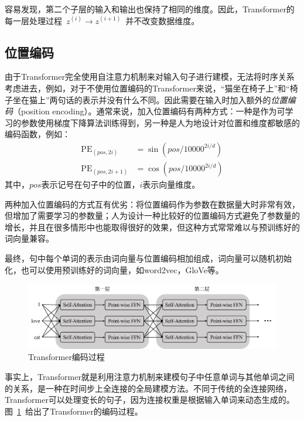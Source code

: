 容易发现，第二个子层的输入和输出也保持了相同的维度。因此，Transformer的每一层处理过程~$z^{(i)} \to z^{(i+1)}$~并不改变数据维度。
\subsection{位置编码}
由于Transformer完全使用自注意力机制来对输入句子进行建模，无法将时序关系考虑进去，例如，对于不使用位置编码的Transformer来说，“猫坐在椅子上”和“椅子坐在猫上”两句话的表示并没有什么不同。因此需要在输入时加入额外的\emph{位置编码}（position encoding）。通常来说，加入位置编码有两种方式：一种是作为可学习的参数使用梯度下降算法训练得到，另一种是人为地设计对位置和维度都敏感的编码函数，例如：
\begin{equation}
	\begin{aligned}
	\mathrm{PE}_{(pos, 2i)} &= \sin(pos/10000^{2i/d})\\
	\mathrm{PE}_{(pos, 2i+1)} &= \cos(pos/10000^{2i/d})
	\end{aligned}
\end{equation}
其中，$pos$表示记号在句子中的位置，$i$表示向量维度。

两种加入位置编码的方式互有优劣：将位置编码作为参数在数据量大时非常有效，但增加了需要学习的参数量；人为设计一种比较好的位置编码方式避免了参数量的增长，并且在很多情形中也能取得很好的效果，但这种方式常常难以与预训练好的词向量兼容。

最终，句中每个单词的表示由词向量与位置编码相加组成，词向量可以随机初始化，也可以使用预训练好的词向量，如word2vec，GloVe等。

\begin{figure}[htb]
	\centering
	\includegraphics[scale=0.46]{tf_s.png}
	\caption{Transformer编码过程}
	\label{fig:tf_s}
\end{figure}

事实上，Transformer就是利用注意力机制来建模句子中任意单词与其他单词之间的关系，是一种在时间步上全连接的全局建模方法。不同于传统的全连接网络，Transformer可以处理变长的句子，因为连接权重是根据输入单词来动态生成的。图~\ref{fig:tf_s}~给出了Transformer的编码过程。

